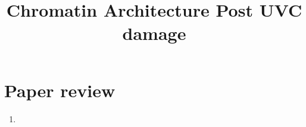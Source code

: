 \documentclass[12pt]{report}
\begin{document}
	
	\title{Chromatin Architecture Post UVC damage}
	\maketitle
	\section{Paper review}
	\begin{enumerate}
		\item 
	\end{enumerate}
	
	
\end{document}
